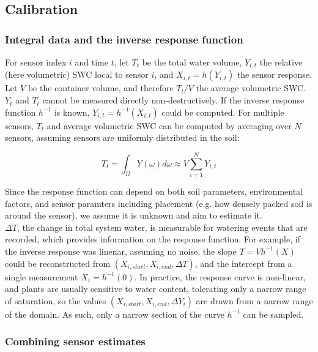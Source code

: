 \documentclass[11pt]{article}
\begin{document}
\subsection{Calibration}

\subsubsection{Integral data and the inverse response function}

For sensor index $i$ and time $t$, let $T_t$ be the total water volume, $Y_{i,t}$ the relative (here volumetric) SWC local to sensor $i$, and $X_{i, t} = h(Y_{i,t})$ the sensor response. Let $V$ be the container volume, and therefore $T_t/V$ the average volumetric SWC. $Y_t$ and $T_t$ cannot be measured directly non-destructively. If the inverse response function $h^{-1}$ is known, $Y_{i,t} = h^{-1}(X_{i,t})$ could be computed. For multiple sensors, $T_t$ and average volumetric SWC can be computed by averaging over $N$ sensors, assuming sensors are uniformly distributed in the soil:

\begin{equation}
T_t = \int_{\Omega} Y(\omega) d\omega \approx V \sum_{i=1}^N Y_{i,t}
\end{equation}

Since the response function can depend on both soil parameters, environmental factors, and sensor paramters including placement (e.g. how densely packed soil is around the sensor), we assume it is unknown and aim to estimate it. \\

$\Delta T$, the change in total system water, is measurable for watering events that are recorded, which provides information on the response function. For example, if the inverse response was linenar, assuming no noise, the slope $T = Vh^{-1}(X)$ could be reconstructed from $(X_{i, start}, X_{i, end}, \Delta T)$, and the intercept from a single measurement $X_i = h^{-1}(0)$. In practice, the response curve is non-linear, and plants are usually sensitive to water content, tolerating only a narrow range of saturation, so the values $(X_{i,start}, X_{i,end}, \Delta Y_i)$ are drawn from a narrow range of the domain. As such, only a narrow section of the curve $h^{-1}$ can be sampled. \\

\subsubsection{Combining sensor estimates}
\end{document}
